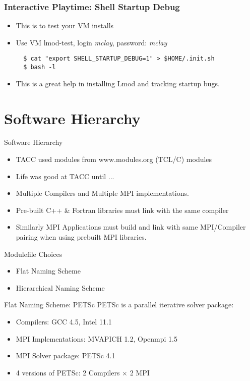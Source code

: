\documentclass{beamer}
\begin{document}
\begin{frame}[fragile]
    \frametitle{Interactive Playtime: Shell Startup Debug}
  \begin{itemize}
    \item This is to test your VM installs
    \item Use VM lmod-test, login \emph{mclay}, password: \emph{mclay}
    {\small
\begin{verbatim}
  $ cat "export SHELL_STARTUP_DEBUG=1" > $HOME/.init.sh
  $ bash -l
\end{verbatim}
}
    \item This is a great help in installing Lmod and tracking startup bugs.
  \end{itemize}
\end{frame}




\section{Software Hierarchy}

\begin{frame}{Software Hierarchy}
  \begin{itemize}
    \item TACC used modules from www.modules.org (TCL/C) modules
    \item Life was good at TACC until ...
    \item Multiple Compilers and Multiple MPI implementations.
    \item Pre-built C++ \& Fortran libraries must link with the same compiler
    \item Similarly MPI Applications must build and link with same
      MPI/Compiler pairing when using prebuilt MPI libraries.
  \end{itemize}
\end{frame}

\begin{frame}{Modulefile Choices}
  \begin{itemize}
    \item Flat Naming Scheme
    \item Hierarchical Naming Scheme
  \end{itemize}
\end{frame}

\begin{frame}{Flat Naming Scheme: PETSc}
  PETSc is a parallel iterative solver package:
  \begin{itemize}
    \item Compilers: GCC 4.5, Intel 11.1
    \item MPI Implementations: MVAPICH 1.2, Openmpi 1.5
    \item MPI Solver package: PETSc 4.1
    \item 4 versions of PETSc: 2 Compilers $\times$ 2 MPI 
  \end{itemize}
\end{frame}
\end{document}
